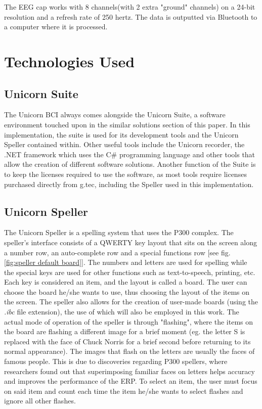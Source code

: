 The EEG cap works with 8 channels(with 2 extra "ground" channels) on a 24-bit resolution and a refresh rate of 250 hertz. The data is outputted via Bluetooth to a computer where it is processed.


\section{Technologies Used}
\subsection{Unicorn Suite}
The Unicorn BCI always comes alongside the Unicorn Suite, a software environment touched upon in the similar solutions section of this paper. In this implementation, the suite is used for its development tools and the Unicorn Speller contained within. Other useful tools include the Unicorn recorder, the .NET framework which uses the C\# programming language and other tools that allow the creation of different software solutions. Another function of the Suite is to keep the licenses required to use the software, as most tools require licenses purchased directly from g.tec\cite{Unicorn_Shop}, including the Speller used in this implementation.


\subsection{Unicorn Speller}
The Unicorn Speller is a spelling system that uses the P300 complex\cite{UnicornSuite_Manual}. The speller's interface consists of a QWERTY key layout that sits on the screen along a number row, an auto-complete row and a special functions row [see fig. \ref{fig:speller default board}]. The numbers and letters are used for spelling while the special keys are used for other functions such as text-to-speech, printing, etc. Each key is considered an item, and the layout is called a board. The user can choose the board he/she wants to use, thus choosing the layout of the items on the screen. The speller also allows for the creation of user-made boards (using the \textit{.ibc} file extension), the use of which will also be employed in this work. 
\vspace{\baselineskip}\newline
The actual mode of operation of the speller is through "flashing"\cite{UnicornSuite_Manual}, where the items on the board are flashing a different image for a brief moment (eg. the letter S is replaced with the face of Chuck Norris for a brief second before returning to its normal appearance). The images that flash on the letters are usually the faces of famous people. This is due to discoveries regarding P300 spellers, where researchers found out that superimposing familiar faces on letters helps accuracy and improves the performance of the ERP\cite{Li_2015}\cite{Kaufmann_2011}. To select an item, the user must focus on said item and count each time the item he/she wants to select flashes and ignore all other flashes\cite{UnicornSuite_Manual}.

